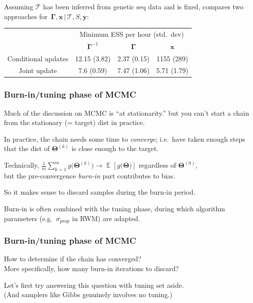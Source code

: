 \documentclass[18pt]{beamer}
\newcommand{\titleSmallCap}[1]{{\fontsize{12}{14}\selectfont  \MakeUppercase{#1}}}
\newcommand{\smallCap}[1]{{\small \MakeUppercase{#1}}}
\DeclareMathOperator{\expectation}{\mathbb{E}}
\newcommand{\randVar}{\Theta}
\newcommand{\brandVar}{\bm{\randVar}}
\newcommand{\mcmc}{{\small MCMC}}
\newcommand{\mcIndex}{k}
\newcommand{\mcSampleSize}{m}
\begin{document}
\begin{frame}
\frametitle{\frametitleText}

Assuming $\mathcal{T}$ has been inferred from genetic seq data and is fixed, 
\cite{zhang2022laplace_gause_hmc} compares two approaches for $\, \bm{\Gamma}, \bm{x} \, | \,\mathcal{T}, S, \bm{y}$:

\pause
\smallskip
\begin{table}[htbp]
\centering
\begin{tabular}{cccc}
\midrule
& \multicolumn{3}{c}{Minimum ESS per hour (std.\ dev)} \\[2pt]
& $\bm{\Gamma}^{-1}$ & $\bm{\Gamma}$ & $\bm{x}$ \\
\midrule
Conditional updates
    & 12.15 (3.82) & 2.37 (0.15) & 1155 (289) \\
Joint update 
    & 7.6 (0.59) & 7.47 (1.06) & 5.71 (1.79) \\
\midrule
\end{tabular}
\end{table}
\end{frame}


\renewcommand{\frametitleText}{Burn-in/tuning phase of \titleSmallCap{MCMC}}
\begin{frame}
\frametitle{\frametitleText}

Much of the discussion on \mcmc{} is ``at stationarity.'' but you can't start a chain from the stationary (= target) dist in practice.

In practice, the chain needs some time to \textit{converge}; 
i.e.\ have taken enough steps that the dist of $\brandVar^{(\mcIndex)}$ is close enough to the target.

\pause
\vspace*{9pt}
Technically,
$\frac{1}{\mcSampleSize} \sum_{\mcIndex = 1}^\mcSampleSize g\bigl( \brandVar^{(\mcIndex)} \bigr) 
	\to \expectation \! \left[ g\bigl( \brandVar \bigr) \right]$
regardless of $\brandVar^{(0)}$,\\
but the pre-convergence \textit{burn-in} part contributes to bias.

So it makes sense to discard samples during the burn-in period.

\pause
\vspace*{8pt}
Burn-in is often combined with the tuning phase, during which algorithm parameters (e.g.\ $\sigma_{\textrm{prop}}$ in \smallCap{rwm}) are adapted.
\end{frame}


\begin{frame}
\frametitle{\frametitleText}
How to determine if the chain has converged?\\
More specifically, how many burn-in iterations to discard?

\pause
\medskip
Let's first try answering this question with tuning set aside.\\
(And samplers like Gibbs genuinely involves no tuning.)
\end{frame}
\end{document}
